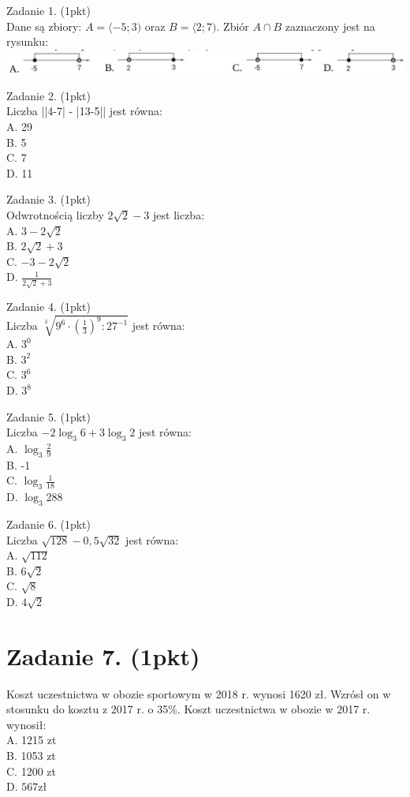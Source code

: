 \documentclass[10pt]{article}
\begin{document}
Zadanie 1. (1pkt)\\
Dane są zbiory: \(A=\langle-5 ; 3)\) oraz \(B=\langle 2 ; 7)\). Zbiór \(A \cap B\) zaznaczony jest na rysunku:\\
\includegraphics[max width=\textwidth, center]{2024_11_21_87037534e5fdc524263ag-02}

Zadanie 2. (1pkt)\\
Liczba ||4-7| - |13-5|| jest równa:\\
A. 29\\
B. 5\\
C. 7\\
D. 11

Zadanie 3. (1pkt)\\
Odwrotnością liczby \(2 \sqrt{2}-3\) jest liczba:\\
A. \(3-2 \sqrt{2}\)\\
B. \(2 \sqrt{2}+3\)\\
C. \(-3-2 \sqrt{2}\)\\
D. \(\frac{1}{2 \sqrt{2}+3}\)

Zadanie 4. (1pkt)\\
Liczba \(\sqrt[3]{9^{6} \cdot\left(\frac{1}{3}\right)^{9}: 27^{-1}}\) jest równa:\\
A. \(3^{0}\)\\
B. \(3^{2}\)\\
C. \(3^{6}\)\\
D. \(3^{8}\)

Zadanie 5. (1pkt)\\
Liczba \(-2 \log _{3} 6+3 \log _{3} 2\) jest równa:\\
A. \(\log _{3} \frac{2}{9}\)\\
B. -1\\
C. \(\log _{3} \frac{1}{18}\)\\
D. \(\log _{3} 288\)

Zadanie 6. (1pkt)\\
Liczba \(\sqrt{128}-0,5 \sqrt{32}\) jest równa:\\
A. \(\sqrt{112}\)\\
B. \(6 \sqrt{2}\)\\
C. \(\sqrt{8}\)\\
D. \(4 \sqrt{2}\)

\section*{Zadanie 7. (1pkt)}
Koszt uczestnictwa w obozie sportowym w 2018 r. wynosi 1620 zł. Wzrósł on w stosunku do kosztu z 2017 r. o 35\%. Koszt uczestnictwa w obozie w 2017 r. wynosił:\\
A. 1215 zt\\
B. 1053 zt\\
C. 1200 zt\\
D. \(567 \mathrm{zł}\)
\end{document}
